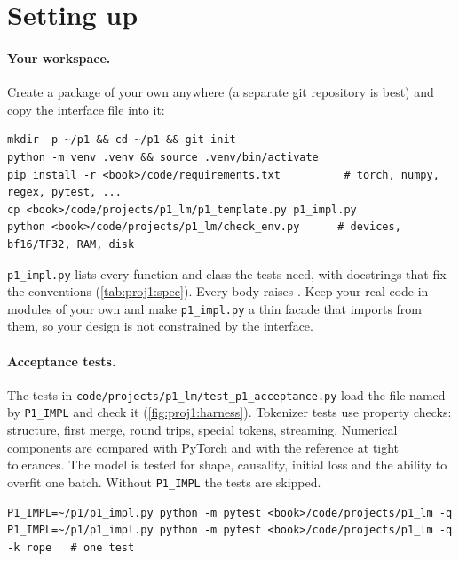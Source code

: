 \section{Setting up}\label{sec:proj1:setup}

\paragraph{Your workspace.} Create a package of your own anywhere (a separate git repository
is best) and copy the interface file into it:
\begin{lstlisting}[style=shell]
mkdir -p ~/p1 && cd ~/p1 && git init
python -m venv .venv && source .venv/bin/activate
pip install -r <book>/code/requirements.txt          # torch, numpy, regex, pytest, ...
cp <book>/code/projects/p1_lm/p1_template.py p1_impl.py
python <book>/code/projects/p1_lm/check_env.py      # devices, bf16/TF32, RAM, disk
\end{lstlisting}
\texttt{p1\_impl.py} lists every function and class the tests need, with docstrings that fix the
conventions (\cref{tab:proj1:spec}). Every body raises . Keep your
real code in modules of your own and make \texttt{p1\_impl.py} a thin facade that imports from
them, so your design is not constrained by the interface.

\paragraph{Acceptance tests.} The tests in \texttt{code/projects/p1\_lm/test\_p1\_acceptance.py}
load the file named by \texttt{P1\_IMPL} and check it (\cref{fig:proj1:harness}). Tokenizer tests
use property checks: structure, first merge, round trips, special tokens, streaming. Numerical
components are compared with PyTorch and with the  reference at tight tolerances. The
model is tested for shape, causality, initial loss and the ability to overfit one batch. Without
\texttt{P1\_IMPL} the tests are skipped.
\begin{lstlisting}[style=shell]
P1_IMPL=~/p1/p1_impl.py python -m pytest <book>/code/projects/p1_lm -q
P1_IMPL=~/p1/p1_impl.py python -m pytest <book>/code/projects/p1_lm -q -k rope   # one test
\end{lstlisting}

